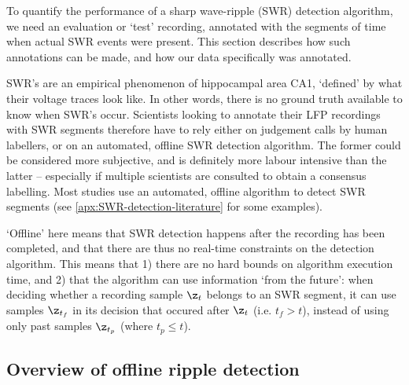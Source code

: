 \label{sec:offline}

To quantify the performance of a sharp wave-ripple (SWR) detection algorithm, we need an evaluation or `test' recording, annotated with the segments of time when actual SWR events were present. This section describes how such annotations can be made, and how our data specifically was annotated.

SWR's are an empirical phenomenon of hippocampal area CA1, `defined' by what their voltage traces look like. In other words, there is no ground truth available to know when SWR's occur. Scientists looking to annotate their LFP recordings with SWR segments therefore have to rely either on judgement calls by human labellers, or on an automated, offline SWR detection algorithm. The former could be considered more subjective, and is definitely more labour intensive than the latter -- especially if multiple scientists are consulted to obtain a consensus labelling. Most studies use an automated, offline algorithm to detect SWR segments (see \cref{apx:SWR-detection-literature} for some examples).

`Offline' here means that SWR detection happens after the recording has been completed, and that there are thus no real-time constraints on the detection algorithm. This means that 1) there are no hard bounds on algorithm execution time, and 2) that the algorithm can use information `from the future': when deciding whether a recording sample $\z_t$ belongs to an SWR segment, it can use samples $\z_{t_f}$ in its decision that occured after $\z_t$ (i.e. $t_f > t$), instead of using only past samples $\z_{t_p}$ (where $t_p \leq t$).



\subsection{Overview of offline ripple detection}

